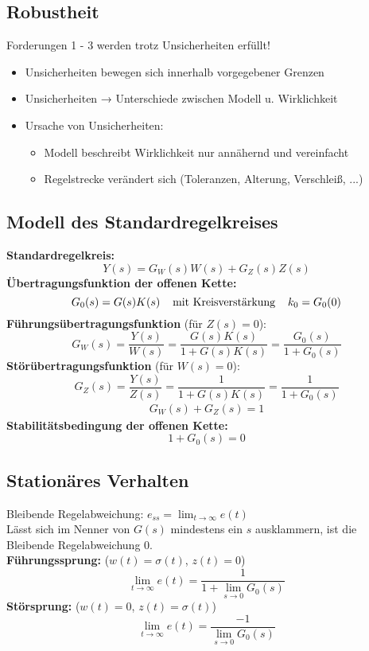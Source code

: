 \documentclass[german]{latex4ei/latex4ei_sheet}
\begin{document}
\begin{sectionbox}
    \subsection{Robustheit}
    \vspace{1mm}
    Forderungen 1 - 3 werden trotz Unsicherheiten erfüllt!
    \begin{itemize}
        \item Unsicherheiten bewegen sich innerhalb vorgegebener Grenzen
        \item Unsicherheiten → Unterschiede zwischen Modell u. Wirklichkeit
        \item Ursache von Unsicherheiten:
        \begin{itemize}
            \item Modell beschreibt Wirklichkeit nur annähernd und vereinfacht
            \item Regelstrecke verändert sich (Toleranzen, Alterung, Verschleiß, ...)
        \end{itemize}
    \end{itemize}
    
\end{sectionbox}
    \begin{sectionbox}
        \subsection{Modell des Standardregelkreises}
        \vspace{1mm}
        \textbf{Standardregelkreis:} \[Y(s) = G_W(s)W(s) + G_Z(s)Z(s)\]
        \textbf{Übertragungsfunktion der offenen Kette:} \[G_0(s) = G(s)K(s) \hspace{4mm} \text{mit Kreisverstärkung} \hspace{4mm} k_0 = G_0(0)\]
        \textbf{Führungsübertragungsfunktion} (für $Z(s)=0$): \[ G_{W}(s)  = \frac{Y(s)}{W(s)} = \frac{G(s)K(s)}{1+G(s)K(s)} = \frac{G_0(s)}{1+G_0(s)}\]
        \textbf{Störübertragungsfunktion} (für $W(s)=0$): \[ G_{Z}(s) = \frac{Y(s)}{Z(s)} = \frac{1}{1+G(s)K(s)} = \frac{1}{1+G_0(s)}\]
        \begin{align*}
            G_{W}(s) + G_{Z}(s) = 1
        \end{align*}
        \textbf{Stabilitätsbedingung der offenen Kette:} \[ 1 + G_0(s) = 0\]


        \subsection{Stationäres Verhalten}
        \vspace{1mm}
        Bleibende Regelabweichung: $e_{ss} = \lim_{t \to \infty} e(t)$ \\
        Lässt sich im Nenner von $G(s)$ mindestens ein $s$ ausklammern, ist die Bleibende Regelabweichung $0$.
        \vspace{2mm}\\
        \textbf{Führungssprung:} ($w(t) = \sigma(t)$, $z(t) = 0$) \[ \lim_{t \to \infty} e(t) = \frac{1}{1 + \lim_{s \to 0} G_0(s)}\]
        \textbf{Störsprung:} ($w(t) = 0$, $z(t) = \sigma(t)$) \[ \lim_{t \to \infty} e(t) = \frac{-1}{\lim_{s \to 0} G_0(s)}\]
    \end{sectionbox}
\end{document}
